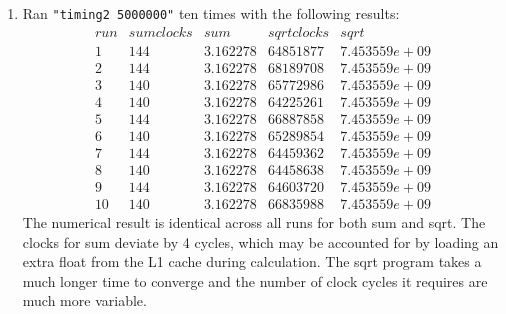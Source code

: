 \documentclass[12pt,fleqn,leqno,letterpaper]{article}
\begin{document}
\begin{enumerate}
    \item Ran \texttt{"timing2 5000000"} ten times with the following
        results:\\
        $$
        \begin{array}{lcccc}
            run & sum clocks & sum & sqrt clocks & sqrt \\
            1 & 144 & 3.162278 & 64851877 & 7.453559e+09 \\
            2 & 144 & 3.162278 & 68189708 & 7.453559e+09 \\
            3 & 140 & 3.162278 & 65772986 & 7.453559e+09 \\
            4 & 140 & 3.162278 & 64225261 & 7.453559e+09 \\
            5 & 144 & 3.162278 & 66887858 & 7.453559e+09 \\
            6 & 140 & 3.162278 & 65289854 & 7.453559e+09 \\
            7 & 144 & 3.162278 & 64459362 & 7.453559e+09 \\
            8 & 140 & 3.162278 & 64458638 & 7.453559e+09 \\
            9 & 144 & 3.162278 & 64603720 & 7.453559e+09 \\
            10 & 140 & 3.162278 & 66835988 & 7.453559e+09
        \end{array}
        $$
        The numerical result is identical across all runs for both sum and sqrt.
        The clocks for sum deviate by 4 cycles, which may be accounted for by
        loading an extra float from the L1 cache during calculation. The sqrt
        program takes a much longer time to converge and the number of clock
        cycles it requires are much more variable.


\end{enumerate}
\end{document}
